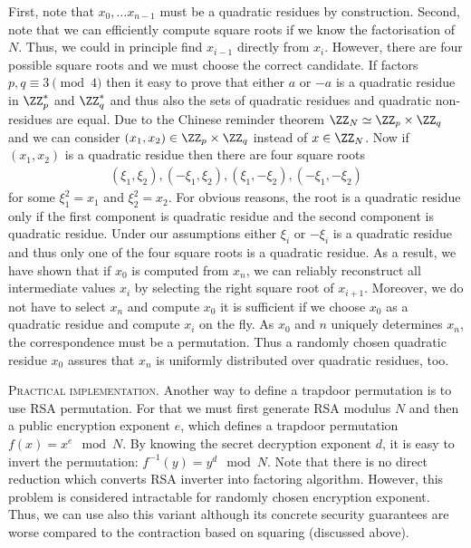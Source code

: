 \documentclass{crypto-exercise}
\begin{document}
\begin{solution}
First, note that $x_0,\ldots x_{n-1}$ must be a quadratic residues by construction. Second,
note that we can efficiently compute square roots if we know the factorisation of $N$. Thus, we could in principle find $x_{i-1}$ directly from $x_i$. However, there are four possible square roots and we must choose the correct candidate. If factors $p,q\equiv 3 \pmod{4}$ then it easy to prove that either $a$ or $-a$ is a quadratic residue in $\ZZ_p^*$ and $\ZZ_q^*$ and thus also the sets of quadratic residues and quadratic non-residues are equal. Due to the Chinese reminder theorem $\ZZ_N\simeq\ZZ_p\times\ZZ_q$ and we can consider $(x_1,x_2)\in \ZZ_p\times\ZZ_q$ instead of $x\in\ZZ_N$. Now if $(x_1,x_2)$ is a quadratic residue then there are four square roots 
\begin{align*}
(\xi_1,\xi_2), (-\xi_1,\xi_2), (\xi_1,-\xi_2), (-\xi_1,-\xi_2) 
\end{align*} 
for some $\xi_1^2=x_1$ and $\xi_2^2=x_2$. For obvious reasons, the root is a quadratic residue only if the first component is quadratic residue and the second component is quadratic residue. Under our assumptions either $\xi_i$ or $-\xi_i$ is a quadratic residue and thus only one of the four square roots is a quadratic residue.  As a result, we have shown that if $x_0$ is computed from $x_n$, we can reliably reconstruct all intermediate values $x_i$ by selecting the right square root of $x_{i+1}$. Moreover, we do not have to select $x_n$ and compute $x_0$ it is sufficient if we choose $x_0$ as a quadratic residue and compute $x_i$ on the fly. As $x_0$ and $n$ uniquely determines $x_n$, the correspondence must be a permutation. Thus a randomly chosen quadratic residue $x_0$ assures that $x_n$ is uniformly distributed over quadratic residues, too.

\vspace*{2ex}
\noindent
\textsc{Practical implementation.}
Another way to define a trapdoor permutation is to use RSA permutation. For that we must first generate RSA modulus $N$ and then a public encryption exponent $e$, which defines a trapdoor permutation $f(x)=x^e\mod N$. By knowing the secret decryption exponent $d$, it is  easy to invert the permutation: $f^{-1}(y)=y^d\mod N$. Note that there is no direct reduction which converts RSA inverter into factoring algorithm. However, this problem is considered intractable for randomly chosen encryption exponent. Thus, we can use also this variant although its concrete security guarantees are worse compared to the contraction based on squaring (discussed above).       

\end{solution}
\end{document}
